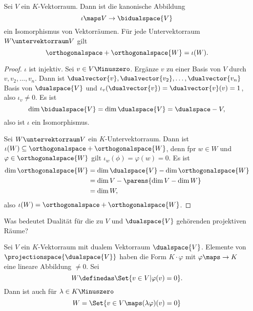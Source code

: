 \begin{satz}
  Sei \( V \) ein \( K \)-Vektorraum. Dann ist die kanonische Abbildung
  \begin{equation*}
    \iota\maps V\to \bidualspace{V}
  \end{equation*}
  ein Isomorphismus von Vektorräumen. Für jede Untervektorraum \( W\untervektorraum V \) gilt
  \begin{equation*}
    \orthogonalspace+{\orthogonalspace{W}}=\iota(W).
  \end{equation*}
\end{satz}
\begin{proof}
  \( \iota \) ist injektiv. Sei \( v\in V\Minuszero \). Ergänze \( v \) zu einer Basis von \( V \) durch \( v,v_2,\dotsc,v_n \). Dann ist \( \dualvector{v},\dualvector{v_2},\dotsc,\dualvector{v_n} \) Basis von \( \dualspace{V} \) und \( \iota_v(\dualvector{v})=\dualvector{v}(v)=1 \), also \( \iota_v\neq 0 \). Es ist 
  \begin{equation*}
    \dim{\bidualspace{V}}=\dim{\dualspace{V}}=\dualspace-{V},
  \end{equation*}
  also ist \( \iota \) ein Isomorphismus.

  Sei \( W\untervektorraum V \) ein \( K \)-Untervektorraum. Dann ist \( \iota(W)\subseteq \orthogonalspace+{\orthogonalspace{W}} \), denn fpr \( w\in W \) und \( \varphi\in \orthogonalspace{W} \) gilt \( \iota_w(\phi)=\varphi(w)=0 \). Es ist
  \begin{align*}
    \dim{\orthogonalspace{W}}&=\dim{\dualspace{V}}-\dim{\orthogonalspace{W}}\\
    &=\dim{V}-\parens{\dim{V}-\dim{W}}\\
    &=\dim{W},
  \end{align*}
  also \( \iota(W)=\orthogonalspace+{\orthogonalspace{W}} \).
\end{proof}
\begin{frage*}
  Was bedeutet Dualität für die zu \( V \) und \( \dualspace{V} \) gehörenden projektiven Räume?
\end{frage*}
Sei \( V \) ein \( K \)-Vektorraum mit dualem Vektorraum \( \dualspace{V} \). Elemente von \( \projectionspace{\dualspace{V}} \) haben die Form \( K\cdot \varphi \) mit \( \varphi\maps \to K \) eine lineare Abbildung \( \neq 0 \). Sei 
\begin{equation*}
  W\definedas \Set{v\in V|\varphi(v)=0}.
\end{equation*}
Dann ist auch für \( \lambda\in K\Minuszero \)
\begin{equation*}
  W=\Set{v\in V\maps (\lambda \varphi)(v)=0}
\end{equation*}
